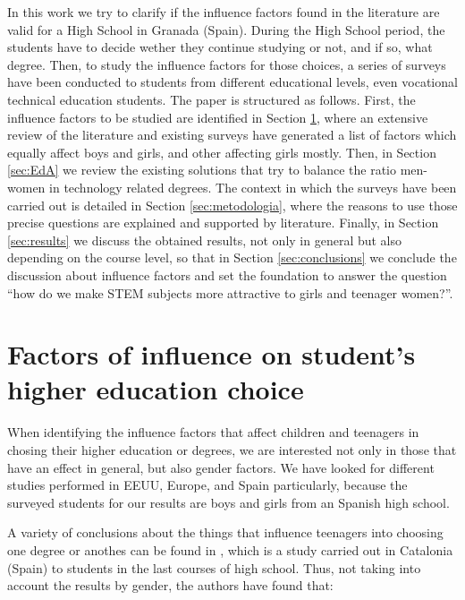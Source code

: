 \documentclass[journal,transmag]{IEEEtran}
\begin{document}
In this work we try to clarify if the influence factors found in the literature are valid for a High School in Granada (Spain). During the High School period, the students have to decide wether they continue studying or not, and if so, what degree. Then, to study the influence factors for those choices, a series of surveys have been conducted to students from different educational levels, even vocational technical education students. The paper is structured as follows. First, the influence factors to be studied are identified in Section \ref{sec:factores}, where an extensive review of the literature and existing surveys have generated a list of factors which equally affect boys and girls, and other affecting girls mostly. Then, in Section \ref{sec:EdA} we review the existing solutions that try to balance the ratio men-women in technology related degrees. The context in which the surveys have been carried out is detailed in Section \ref{sec:metodologia}, where the reasons to use those precise questions are explained and supported by literature. Finally, in Section \ref{sec:results} we discuss the obtained results, not only in general but also depending on the course level, so that in Section \ref{sec:conclusions} we conclude the discussion about influence factors and set the foundation to answer the question ``how do we make STEM subjects more attractive to girls and teenager women?''.

\section{Factors of influence on student's higher education choice}
\label{sec:factores}

When identifying the influence factors that affect children and teenagers in chosing their higher education or degrees, we are interested not only in those that have an effect in general, but also gender factors. We have looked for different studies performed in EEUU, Europe, and Spain particularly, because the surveyed students for our results are boys and girls from an Spanish high school.

A variety of conclusions about the things that influence teenagers into choosing one degree or anothes can be found in \cite{everis2012}, which is a study carried out in Catalonia (Spain) to students in the last courses of high school. Thus, not taking into account the results by gender, the authors have found that:
\end{document}

